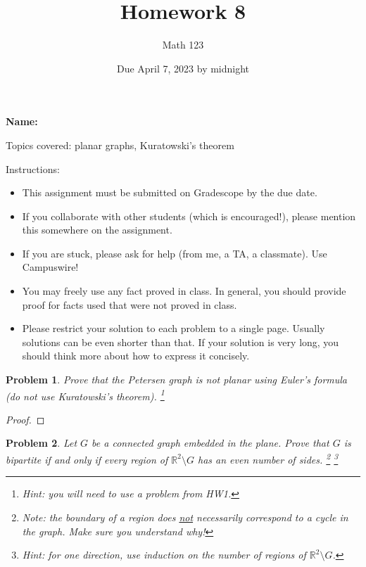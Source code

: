 \documentclass[11pt]{article}
\author{Math 123}
\date{Due April 7, 2023 by midnight}
\title{Homework 8}
\newtheorem{problem}{Problem}
\begin{document}
\maketitle

{\bf\Large Name:} 


\vspace{.3in}
Topics covered: planar graphs, Kuratowski's theorem

Instructions: 
\begin{itemize}
\item This assignment must be submitted on Gradescope by the due date. 
\item If you collaborate with other students (which is encouraged!), please mention this somewhere on the assignment. 
\item If you are stuck, please ask for help (from me, a TA, a classmate). Use Campuswire!  
\item You may freely use any fact proved in class. In general, you should provide proof for facts used that were not proved in class. 
\item Please restrict your solution to each problem to a single page. Usually solutions can be even shorter than that. If your solution is very long, you should think more about how to express it concisely.
\end{itemize}



\pagebreak 


\begin{problem}
Prove that the Petersen graph is not planar using Euler's formula (do not use Kuratowski's theorem). \footnote{Hint: you will need to use a problem from HW1.} 
\end{problem}

\begin{proof}

\end{proof}

\pagebreak

\begin{problem}
Let $G$ be a connected graph embedded in the plane. Prove that $G$ is bipartite if and only if every region of $\mathbb R^2\setminus G$ has an even number of sides. \footnote{Note: the boundary of a region does \underline{not} necessarily correspond to a cycle in the graph. Make sure you understand why!} \footnote{Hint: for one direction, use induction on the number of regions of $\mathbb R^2\setminus G$.} 
\end{problem}
\end{document}
